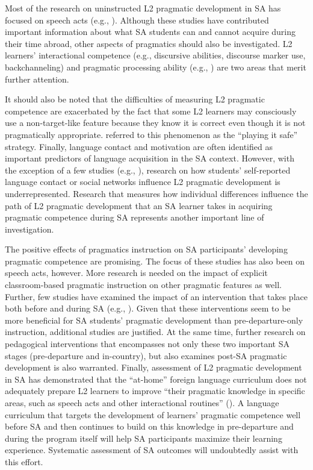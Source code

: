 \documentclass[output=paper]{langscibook}
\begin{document}
Most of the research on uninstructed L2 pragmatic development in SA has focused on speech acts (e.g., \citealt{Félix-BrasdeferHasler-Barker2015,Hernández2016,Hernández2018b,Ren2014,Ren2019,ShivelyCohen2008}). Although these studies have contributed important information about what SA students can and cannot acquire during their time abroad, other aspects of pragmatics should also be investigated. L2 learners’ interactional competence (e.g., discursive abilities, discourse marker use, backchanneling) and pragmatic processing ability (e.g., \citealt{Hernándezinpress,Li2014}) are two areas that merit further attention.

It should also be noted that the difficulties of measuring L2 pragmatic competence are exacerbated by the fact that some L2 learners may consciously use a non-target-like feature because they know it is correct even though it is not pragmatically appropriate. \citet{Barron2003} referred to this phenomenon as the “playing it safe” strategy. Finally, language contact and motivation are often identified as important predictors of language acquisition in the SA context. However, with the exception of a few studies (e.g., \citealt{Bardovi-HarligBastos2011,Hernández2016,Matsumura2001,ShivelyCohen2008,Taguchi2008a,Taguchi2008b}), research on how students’ self-reported language contact or social networks influence L2 pragmatic development is underrepresented. Research that measures how individual differences influence the path of L2 pragmatic development that an SA learner takes in acquiring pragmatic competence during SA represents another important line of investigation.

The positive effects of pragmatics instruction on SA participants’ developing pragmatic competence are promising. The focus of these studies has also been on speech acts, however. More research is needed on the impact of explicit classroom-based pragmatic instruction on other pragmatic features as well. Further, few studies have examined the impact of an intervention that takes place both before and during SA (e.g., \citealt{Hernándezinpress,HernándezBoero2018a,Shively2011}). Given that these interventions seem to be more beneficial for SA students’ pragmatic development than pre-departure-only instruction, additional studies are justified. At the same time, further research on pedagogical interventions that encompasses not only these two important SA stages (pre-departure and in-country), but also examines post-SA pragmatic development is also warranted. Finally, assessment of L2 pragmatic development in SA has demonstrated that the “at-home” foreign language curriculum does not adequately prepare L2 learners to improve “their pragmatic knowledge in specific areas, such as speech acts and other interactional routines” (\citealt[85]{Félix-BrasdeferHasler-Barker2015}). A language curriculum that targets the development of learners’ pragmatic competence well before SA and then continues to build on this knowledge in pre-departure and during the program itself will help SA participants maximize their learning experience. Systematic assessment of SA outcomes will undoubtedly assist with this effort.

\sloppy
\printbibliography[heading=subbibliography,notkeyword=this]
\end{document}
